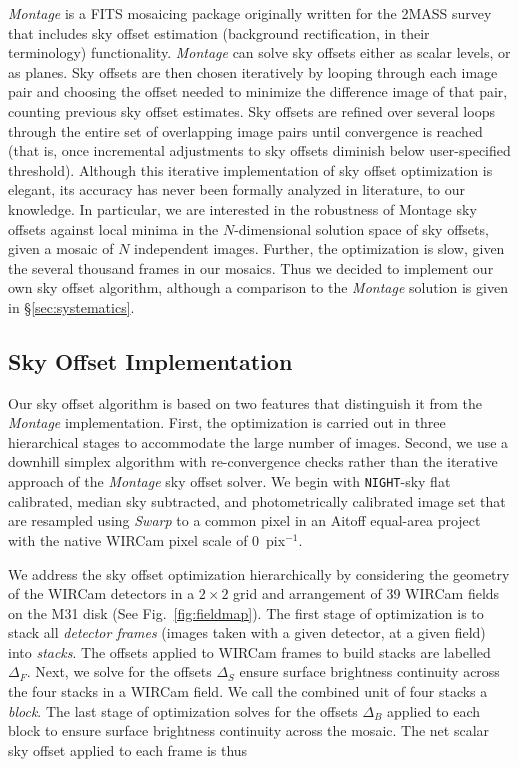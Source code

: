 \documentclass[iop,tighten]{emulateapj}
\newcommand{\sw}[1]{\textit{#1}} %
\newcommand{\Fig}[1]{Fig.~\ref{fig:#1}}  %
\newcommand{\Sec}[1]{\S\ref{sec:#1}}  %
\begin{document}
\sw{Montage} is a FITS mosaicing package \citep{Berriman:2008} originally written for the 2MASS survey that includes sky offset estimation (background rectification, in their terminology) functionality.
\sw{Montage} can solve sky offsets either as scalar levels, or as planes.
Sky offsets are then chosen iteratively by looping through each image pair and choosing the offset needed to minimize the difference image of that pair, counting previous sky offset estimates.
Sky offsets are refined over several loops through the entire set of overlapping image pairs until convergence is reached (that is, once incremental adjustments to sky offsets diminish below user-specified threshold).
Although this iterative implementation of sky offset optimization is elegant, its accuracy has never been formally analyzed in literature, to our knowledge.
In particular, we are interested in the robustness of Montage sky offsets against local minima in the $N$-dimensional solution space of sky offsets, given a mosaic of $N$ independent images.
Further, the optimization is slow, given the several thousand frames in our mosaics.
Thus we decided to implement our own sky offset algorithm, although a comparison to the \sw{Montage} solution is given in \Sec{systematics}.

\subsection{Sky Offset Implementation}
\label{sec:msrnm_algo}

Our sky offset algorithm is based on two features that distinguish it from the \sw{Montage} implementation.
First, the optimization is carried out in three hierarchical stages to accommodate the large number of images.
Second, we use a downhill simplex algorithm \cite[][hereafter, NM]{Nelder:1965} with re-convergence checks rather than the iterative approach of the \sw{Montage} sky offset solver.
We begin with \texttt{NIGHT}-sky flat calibrated, median sky subtracted, and photometrically calibrated image set that are resampled using \sw{Swarp} to a common pixel in an Aitoff equal-area project with the native WIRCam pixel scale of 0~pix$^{-1}$.

We address the sky offset optimization hierarchically by considering the geometry of the WIRCam detectors in a $2 \times 2$ grid and arrangement of 39 WIRCam fields on the M31 disk (See \Fig{fieldmap}).
The first stage of optimization is to stack all \emph{detector frames} (images taken with a given detector, at a given field) into \emph{stacks}.
The offsets applied to WIRCam frames to build stacks are labelled $\Delta_F$.
Next, we solve for the offsets $\Delta_S$ ensure surface brightness continuity across the four stacks in a WIRCam field.
We call the combined unit of four stacks a \emph{block}.
The last stage of optimization solves for the offsets $\Delta_B$ applied to each block to ensure surface brightness continuity across the mosaic.
The net scalar sky offset applied to each frame is thus
\end{document}
